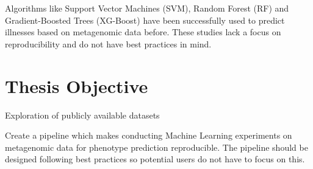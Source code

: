 Algorithms like Support Vector Machines (SVM), Random Forest (RF) and Gradient-Boosted Trees (XG-Boost) have been successfully used to predict illnesses based on metagenomic data before. These studies lack a focus on reproducibility and do not have best practices in mind.

\citep{xgboost}

\section{Thesis Objective}
Exploration of publicly available datasets 

Create a pipeline which makes conducting Machine Learning experiments on metagenomic data for phenotype prediction reproducible. The pipeline should be designed following best practices so potential users do not have to focus on this.
